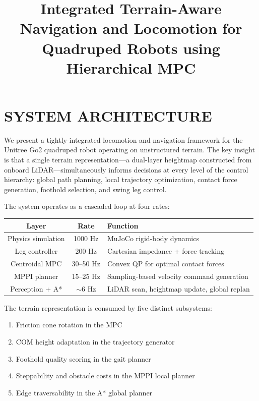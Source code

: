 \documentclass[11pt,a4paper]{article}
\title{Integrated Terrain-Aware Navigation and Locomotion for Quadruped Robots using Hierarchical MPC}
\author{}
\date{}
\begin{document}
\maketitle

\section{SYSTEM ARCHITECTURE}

We present a tightly-integrated locomotion and navigation framework for the Unitree Go2 quadruped robot operating on unstructured terrain. The key insight is that a single terrain representation---a dual-layer heightmap constructed from onboard LiDAR---simultaneously informs decisions at every level of the control hierarchy: global path planning, local trajectory optimization, contact force generation, foothold selection, and swing leg control.

The system operates as a cascaded loop at four rates:

\begin{center}
\begin{tabular}{|c|c|l|}
\hline
\textbf{Layer} & \textbf{Rate} & \textbf{Function} \\
\hline
Physics simulation & 1000 Hz & MuJoCo rigid-body dynamics \\
Leg controller & 200 Hz & Cartesian impedance + force tracking \\
Centroidal MPC & 30--50 Hz & Convex QP for optimal contact forces \\
MPPI planner & 15--25 Hz & Sampling-based velocity command generation \\
Perception + A* & $\sim$6 Hz & LiDAR scan, heightmap update, global replan \\
\hline
\end{tabular}
\end{center}

The terrain representation is consumed by five distinct subsystems:
\begin{enumerate}
\item Friction cone rotation in the MPC
\item COM height adaptation in the trajectory generator
\item Foothold quality scoring in the gait planner
\item Steppability and obstacle costs in the MPPI local planner
\item Edge traversability in the A* global planner
\end{enumerate}
\end{document}
